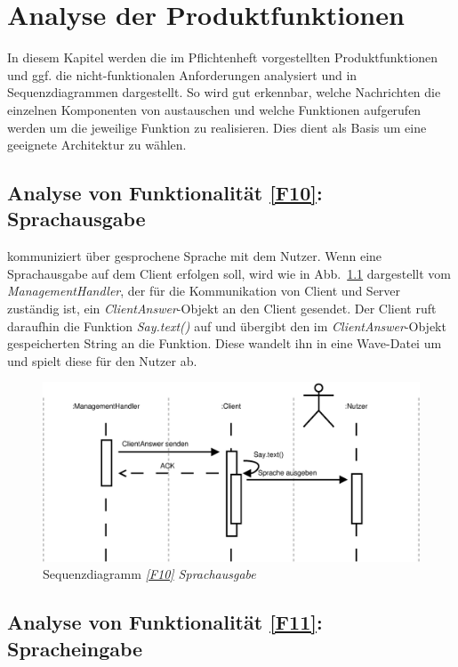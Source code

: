 
\chapter{Analyse der Produktfunktionen}\label{chap:analyse}

In diesem Kapitel werden die im Pflichtenheft vorgestellten Produktfunktionen
und ggf. die nicht-funktionalen Anforderungen analysiert und in
Sequenzdiagrammen dargestellt.
So wird gut erkennbar, welche Nachrichten die einzelnen Komponenten von \NewsGenie austauschen und welche
Funktionen aufgerufen werden um die jeweilige Funktion zu realisieren.
Dies dient als Basis um eine geeignete Architektur zu wählen.


\section{Analyse von Funktionalität \ref{F10}: Sprachausgabe}

\NewsGenie kommuniziert über gesprochene Sprache mit dem Nutzer. Wenn eine
Sprachausgabe auf dem Client erfolgen soll, wird wie in Abb.~\ref{sd10} dargestellt vom \textit{ManagementHandler}, der für die Kommunikation
von Client und Server zuständig ist, ein \textit{ClientAnswer}-Objekt an den
Client gesendet.
Der Client ruft daraufhin die Funktion \textit{Say.text()} auf und übergibt den im
\textit{ClientAnswer}-Objekt gespeicherten String an die Funktion. Diese wandelt
ihn in eine Wave-Datei um und spielt diese für den Nutzer ab.

\begin{figure}[h]
\centering
\includegraphics[width=.8\textwidth]{Systementwurf/02_produktfunktionsanalyse/f100}
\caption{Sequenzdiagramm \textit{\ref{F10} Sprachausgabe} \label{sd10}}
\end{figure}

\section{Analyse von Funktionalität \ref{F11}: Spracheingabe}

